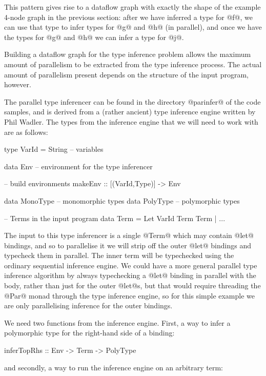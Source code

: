 This pattern gives rise to a dataflow graph with exactly the shape of
the example 4-node graph in the previous section: after we have
inferred a type for @f@, we can use that type to infer types for @g@
and @h@ (in parallel), and once we have the types for @g@ and @h@ we
can infer a type for @j@.

Building a dataflow graph for the type inference problem allows the
maximum amount of parallelism to be extracted from the type inference
process.  The actual amount of parallelism present depends on the
structure of the input program, however.

The parallel type inferencer can be found in the directory @parinfer@
of the code samples, and is derived from a (rather ancient) type
inference engine written by Phil Wadler.  The types from the inference
engine that we will need to work with are as follows:

\begin{numhaskell}
type VarId = String -- variables

data Env -- environment for the type inferencer

-- build environments
makeEnv :: [(VarId,Type)] -> Env

data MonoType -- monomorphic types
data PolyType -- polymorphic types

-- Terms in the input program
data Term = Let VarId Term Term | ...
\end{numhaskell}

The input to this type inferencer is a single @Term@ which may contain
@let@ bindings, and so to parallelise it we will strip off the outer
@let@ bindings and typecheck them in parallel.  The inner term will be
typechecked using the ordinary sequential inference engine.  We could
have a more general parallel type inference algorithm by always
typechecking a @let@ binding in parallel with the body, rather than
just for the outer @let@s, but that would require threading the @Par@
monad through the type inference engine, so for this simple example we
are only parallelising inference for the outer bindings.

We need two functions from the inference engine.  First, a way to
infer a polymorphic type for the right-hand side of a binding:

\begin{haskell}
inferTopRhs :: Env -> Term -> PolyType
\end{haskell}

\noindent and secondly, a way to run the inference engine on an
arbitrary term:

